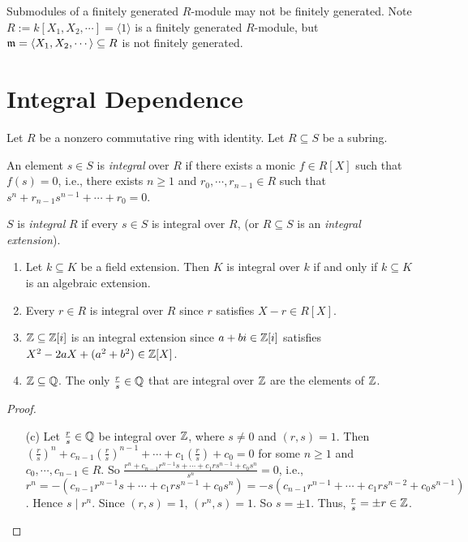\begin{example}\label{5.7}
    Submodules of a finitely generated $R$-module may not be finitely generated. Note $R := k[X_1,X_2,\cdots] = \langle 1 \rangle$ is a finitely generated $R$-module, but $\mathfrak{m} = \langle X_1,X_2,\cdots \rangle \subseteq R$ is not finitely generated.
\end{example}

\section*{Integral Dependence}

Let $R$ be a nonzero commutative ring with identity. Let $R \subseteq S$ be a subring.

\begin{definition}\label{5.8}
    An element $s \in S$ is \emph{integral} over $R$ if there exists a monic $f \in R[X]$ such that $f(s) = 0$, i.e., there exists $n \geq 1$ and $r_0,\cdots,r_{n-1} \in R$ such that $s^{n} + r_{n-1}s^{n-1} + \cdots + r_0 = 0$. \par 
    $S$ is \emph{integral} $R$ if every $s \in S$ is integral over $R$, (or $R \subseteq S$ is an \emph{integral extension}).
\end{definition}

\begin{example}\label{5.9}
    \begin{enumerate}
        \item Let $k \subseteq K$ be a field extension. Then $K$ is integral over $k$ if and only if $k \subseteq K$ is an algebraic extension. 
        \item Every $r \in R$ is integral over $R$ since $r$ satisfies $X-r \in R[X]$. 
        \item $\mathbb{Z} \subseteq \mathbb{Z}[i]$ is an integral extension since $a+bi \in \mathbb{Z}[i]$ satisfies $X^{2}-2aX+(a^{2}+b^{2}) \in \mathbb{Z}[X]$.
        \item $\mathbb{Z} \subseteq \mathbb{Q}$. The only $\frac{r}{s} \in \mathbb{Q}$ that are integral over $\mathbb{Z}$ are the elements of $\mathbb{Z}$.
    \end{enumerate}
\end{example}

\begin{proof}
    \begin{enumerate}
        \item[(c)] Let $\frac{r}{s} \in \mathbb{Q}$ be integral over $\mathbb{Z}$, where $s \neq 0$ and $(r,s) = 1$. Then $(\frac{r}{s})^{n} + c_{n-1} (\frac{r}{s})^{n-1} + \cdots + c_1(\frac{r}{s}) + c_0 = 0$ for some $n \geq 1$ and $c_0,\cdots,c_{n-1} \in R$. So $\frac{r^{n} + c_{n-1}r^{n-1}s + \cdots + c_1rs^{n-1} + c_0s^{n}}{s^{n}} = 0$, i.e., $r^{n} = -(c_{n-1}r^{n-1}s + \cdots + c_1r s^{n-1} + c_0s^{n}) = -s(c_{n-1}r^{n-1} + \cdots + c_1rs^{n-2} + c_0s^{n-1})$. Hence $s \mid r^{n}$. Since $(r,s) = 1$, $(r^{n},s) = 1$. So $s = \pm 1$. Thus, $\frac{r}{s} = \pm r \in \mathbb{Z}$. \qedhere
    \end{enumerate}
\end{proof}

